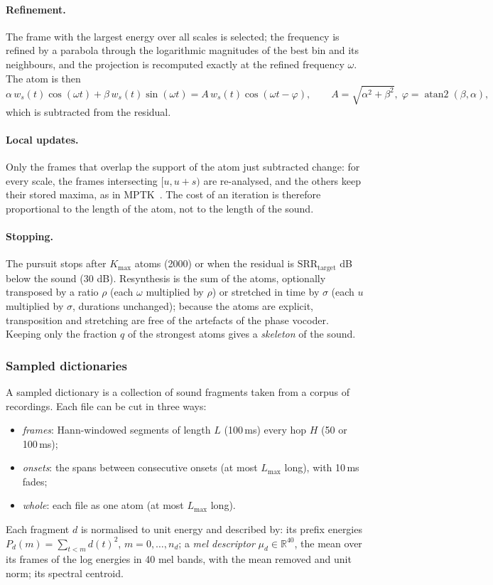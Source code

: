 \documentclass[11pt,a4paper]{article}
\newcommand{\R}{\mathbb{R}}
\begin{document}
\paragraph{Refinement.} The frame with the largest energy over all scales is
selected; the frequency is refined by a parabola through the logarithmic
magnitudes of the best bin and its neighbours, and the projection is
recomputed exactly at the refined frequency $\omega$. The atom is then
\begin{equation}
  \alpha \, w_s(t)\cos(\omega t) + \beta\, w_s(t)\sin(\omega t)
  = A \, w_s(t) \cos(\omega t - \varphi), \qquad
  A = \sqrt{\alpha^2 + \beta^2},\; \varphi = \operatorname{atan2}(\beta, \alpha),
\end{equation}
which is subtracted from the residual.

\paragraph{Local updates.} Only the frames that overlap the support of the
atom just subtracted change: for every scale, the frames intersecting
$[u, u+s)$ are re-analysed, and the others keep their stored maxima, as in
MPTK~\cite{krstulovic2006}. The cost of an iteration is therefore
proportional to the length of the atom, not to the length of the sound.

\paragraph{Stopping.} The pursuit stops after $K_{\max}$ atoms (2000) or when
the residual is $\mathrm{SRR}_{\text{target}}$ dB below the sound (30 dB).
Resynthesis is the sum of the atoms, optionally transposed by a ratio $\rho$
(each $\omega$ multiplied by $\rho$) or stretched in time by $\sigma$ (each
$u$ multiplied by $\sigma$, durations unchanged); because the atoms are
explicit, transposition and stretching are free of the artefacts of the
phase vocoder. Keeping only the fraction $q$ of the strongest atoms gives a
\emph{skeleton} of the sound.

\subsubsection{Sampled dictionaries}

A sampled dictionary is a collection of sound fragments taken from a corpus
of recordings. Each file can be cut in three ways:
\begin{itemize}[leftmargin=*]
  \item \emph{frames}: Hann-windowed segments of length $L$ (100\,ms) every
    hop $H$ (50 or 100\,ms);
  \item \emph{onsets}: the spans between consecutive onsets (at most
    $L_{\max}$ long), with 10\,ms fades;
  \item \emph{whole}: each file as one atom (at most $L_{\max}$ long).
\end{itemize}
Each fragment $d$ is normalised to unit energy and described by:
its prefix energies $P_d(m) = \sum_{t<m} d(t)^2$, $m = 0, \dots, n_d$; a
\emph{mel descriptor} $\mu_d \in \R^{40}$, the mean over its frames of the log
energies in 40 mel bands, with the mean removed and unit norm; its spectral
centroid.
\end{document}
